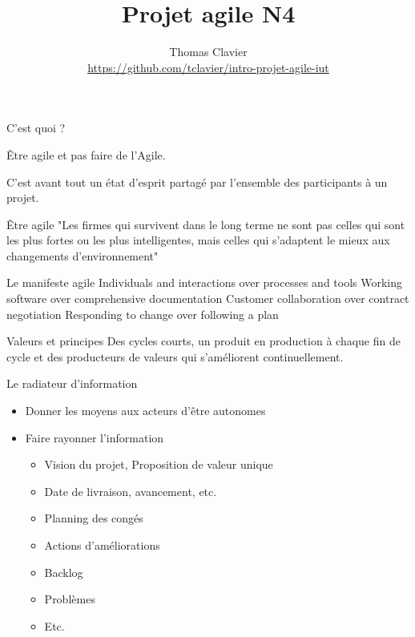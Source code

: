 \documentclass{beamer}
\title{Projet agile N4}
\author{
  Thomas Clavier \\
  \small \url{https://github.com/tclavier/intro-projet-agile-iut}
}
\date{}
\begin{document}
\frame{\titlepage}



\begin{frame}{C'est quoi ?}
 
  {\Large \alert{Être agile} et pas faire de l'Agile.}

  \vspace{6mm}
  C'est avant tout un état d'esprit partagé par l'ensemble des participants à un projet.
\end{frame}

\begin{frame}{Être agile}
  "Les firmes qui survivent dans le long terme ne sont pas celles qui sont les plus fortes ou les plus intelligentes, mais celles qui s'adaptent le mieux aux changements d'environnement"


\end{frame}

\begin{frame}{Le manifeste agile}
  \large
  \alert{Individuals and interactions} over processes and tools\newline
  \alert{Working software} over comprehensive documentation\newline
  \alert{Customer collaboration} over contract negotiation\newline
  \alert{Responding to change} over following a plan
\end{frame}

\begin{frame}{Valeurs et principes}
  \Large Des cycles courts, un produit en production à chaque fin de cycle et des producteurs de valeurs qui s'améliorent continuellement.
\end{frame}

\begin{frame}{Le radiateur d'information}
  \begin{itemize}
    \item Donner les moyens aux acteurs d'être autonomes
    \item Faire rayonner l'information
    
    \begin{itemize}
      \item Vision du projet, Proposition de valeur unique
      \item Date de livraison, avancement, etc.
      \item Planning des congés
      \item Actions d'améliorations
      \item Backlog
      \item Problèmes
      \item Etc.
    \end{itemize}
  \end{itemize}
\end{frame}
\end{document}
